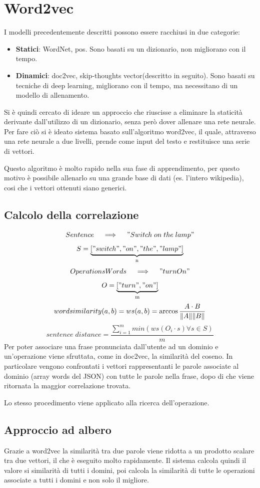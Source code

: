 \documentclass[twoside]{supsistudent}
\begin{document}
\section{Word2vec}
I modelli precedentemente descritti possono essere racchiusi in due categorie:
\begin{itemize}
  \item \textbf{Statici}: WordNet, pos. Sono basati su un dizionario, non migliorano con il tempo.
  \item \textbf{Dinamici}: doc2vec, skip-thoughts vector(descritto in seguito). Sono basati su tecniche di deep learning, migliorano con il tempo, ma necessitano di un modello di allenamento.
\end{itemize}
Si è quindi cercato di ideare un approccio che riuscisse a eliminare la staticità derivante dall'utilizzo di un dizionario, senza però dover allenare una rete neurale.
Per fare ciò si è ideato sistema basato sull'algoritmo word2vec, il quale, attraverso una rete neurale a due livelli, prende come input del testo e restituisce una serie di vettori. 

Questo algoritmo è molto rapido nella sua fase di apprendimento, per questo motivo è possibile allenarlo su una grande base di dati (es. l'intero wikipedia), cosi che i vettori ottenuti siano generici.\cite{word2vec}
\subsection{Calcolo della correlazione}
 \[
 Sentence \quad\implies\quad "Switch\;on\;the\;lamp"
 \]
 \[
 S = 
\underbrace{["switch","on","the","lamp"]}_\text{n}
\]
 \[
 OperationsWords \quad\implies\quad "turnOn"
 \]
 \[
 O = 
\underbrace{["turn","on"]}_\text{m}
\]
 \[
 word similarity (a,b)= ws(a,b) = \arccos{{A \cdot B \over \|A\| \|B\|}}  
\]
 \[
 sentence\;distance = \frac{\sum_{i=1}^{m} min(ws(O_i \cdot s)\forall s \in S)} {m}
 \]
Per poter associare una frase pronunciata dall'utente ad un dominio e un'operazione viene sfruttata, come in doc2vec, la similarità del coseno. In particolare vengono confrontati i vettori rappresentanti le parole associate al dominio (array words del JSON) con tutte le parole nella frase, dopo di che viene ritornata la maggior correlazione trovata.

Lo stesso procedimento viene applicato alla ricerca dell'operazione. 

\subsection{Approccio ad albero}
Grazie a word2vec la similarità tra due parole viene ridotta a un prodotto scalare tra due vettori, il che è eseguito molto rapidamente. Il sistema calcola quindi il valore si similarità di tutti i domini, poi calcola la similarità di tutte le operazioni associate a tutti i domini e non solo il migliore. 
\end{document}
